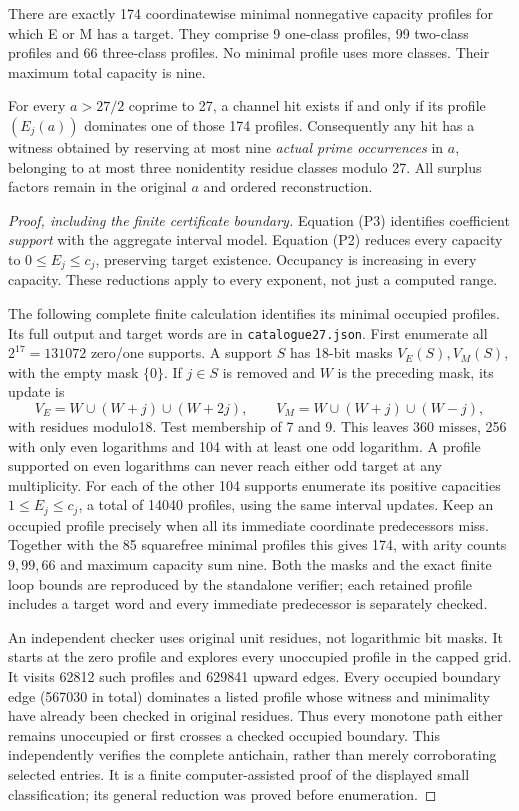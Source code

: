 \begin{theorem}[Complete finite conductor at $R=27$]\label{thm:27}
There are exactly 174 coordinatewise minimal nonnegative capacity profiles
for which E or M has a target. They comprise 9 one-class profiles, 99 two-class
profiles and 66 three-class profiles. No minimal profile uses more classes.
Their maximum total capacity is nine.

For every $a>27/2$ coprime to 27, a channel hit exists if and only if its
profile $(E_j(a))$ dominates one of those 174 profiles. Consequently any hit
has a witness obtained by reserving at most nine \emph{actual prime occurrences}
in $a$, belonging to at most three nonidentity residue classes modulo 27.
All surplus factors remain in the original $a$ and ordered reconstruction.
\end{theorem}
\begin{proof}[Proof, including the finite certificate boundary]
Equation (P3) identifies coefficient \emph{support} with the aggregate interval
model. Equation (P2) reduces every capacity to $0\le E_j\le c_j$, preserving
target existence. Occupancy is increasing in every capacity. These reductions
apply to every exponent, not just a computed range.

The following complete finite calculation identifies its minimal occupied
profiles. Its full output and target words are in \texttt{catalogue27.json}.
First enumerate all $2^{17}=131072$ zero/one supports. A support $S$ has
18-bit masks $V_E(S),V_M(S)$, with the empty mask $\{0\}$. If $j\in S$ is
removed and $W$ is the preceding mask, its update is
\[
 V_E=W\cup(W+j)\cup(W+2j),\qquad
 V_M=W\cup(W+j)\cup(W-j),
 \tag{C2}
\]
with residues modulo18. Test membership of 7 and 9. This leaves 360 misses,
256 with only even logarithms and 104 with at least one odd logarithm.
A profile supported on even logarithms can never reach either odd target at
any multiplicity. For each of the other 104 supports enumerate its positive
capacities $1\le E_j\le c_j$, a total of 14040 profiles, using the same interval
updates. Keep an occupied profile precisely when all its immediate coordinate
predecessors miss. Together with the 85 squarefree minimal profiles this gives
174, with arity counts $9,99,66$ and maximum capacity sum nine. Both the masks
and the exact finite loop bounds are reproduced by the standalone verifier;
each retained profile includes a target word and every immediate predecessor
is separately checked.

An independent checker uses original unit residues, not logarithmic bit masks.
It starts at the zero profile and explores every unoccupied profile in the
capped grid. It visits 62812 such profiles and 629841 upward edges. Every
occupied boundary edge (567030 in total) dominates a listed profile whose
witness and minimality have already been checked in original residues.
Thus every monotone path either remains unoccupied or first crosses a checked
occupied boundary. This independently verifies the complete antichain, rather
than merely corroborating selected entries. It is a finite computer-assisted
proof of the displayed small classification; its general reduction was proved
before enumeration.


\end{proof}
